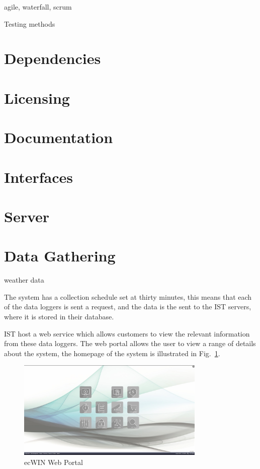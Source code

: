 \documentclass[12pt,onecolumn]{IEEEtran}
\begin{document}
agile, waterfall, scrum

Testing methods

\section{Dependencies} \label{sec:Dependencies}


\section{Licensing} \label{sec:Licensing}

\section{Documentation} \label{sec:Documentation}

\section{Interfaces} \label{sec:Interfaces}

\section{Server} \label{Server}
\section{Data Gathering} \label{sec:DataGathering}
weather data

The system has a collection schedule set at thirty minutes, this means that each of the data loggers is sent a request, and the data is the sent to the IST servers, where it is stored in their database. 


IST host a web service which allows customers to view the relevant information from these data loggers. 
The web portal allows the user to view a range of details about the system, the homepage of the system is illustrated in Fig.~\ref{fig:ecwin}.

\begin{center}
    \begin{figure}[htb]
        \centering
        \includegraphics[width=0.8\textwidth]{ecwin.png}
        \caption{ecWIN Web Portal}
        \label{fig:ecwin}
    \end{figure}
\end{center}
\end{document}
